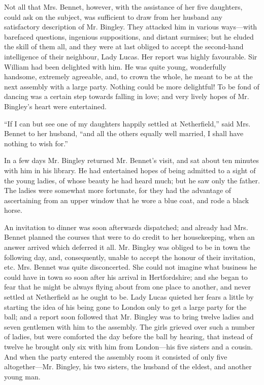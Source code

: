  Not all that Mrs. Bennet, however, with the assistance of her
      five daughters, could ask on the subject, was sufficient to draw
      from her husband any satisfactory description of Mr. Bingley.
      They attacked him in various ways—with barefaced questions,
      ingenious suppositions, and distant surmises; but he eluded the
      skill of them all, and they were at last obliged to accept the
      second-hand intelligence of their neighbour, Lady Lucas. Her
      report was highly favourable. Sir William had been delighted with
      him. He was quite young, wonderfully handsome, extremely
      agreeable, and, to crown the whole, he meant to be at the next
      assembly with a large party. Nothing could be more delightful! To
      be fond of dancing was a certain step towards falling in love;
      and very lively hopes of Mr. Bingley’s heart were entertained.

      “If I can but see one of my daughters happily settled at
      Netherfield,” said Mrs. Bennet to her husband, “and all the
      others equally well married, I shall have nothing to wish for.”

      In a few days Mr. Bingley returned Mr. Bennet’s visit, and sat
      about ten minutes with him in his library. He had entertained
      hopes of being admitted to a sight of the young ladies, of whose
      beauty he had heard much; but he saw only the father. The ladies
      were somewhat more fortunate, for they had the advantage of
      ascertaining from an upper window that he wore a blue coat, and
      rode a black horse.

      An invitation to dinner was soon afterwards dispatched; and
      already had Mrs. Bennet planned the courses that were to do
      credit to her housekeeping, when an answer arrived which deferred
      it all. Mr. Bingley was obliged to be in town the following day,
      and, consequently, unable to accept the honour of their
      invitation, etc. Mrs. Bennet was quite disconcerted. She could
      not imagine what business he could have in town so soon after his
      arrival in Hertfordshire; and she began to fear that he might be
      always flying about from one place to another, and never settled
      at Netherfield as he ought to be. Lady Lucas quieted her fears a
      little by starting the idea of his being gone to London only to
      get a large party for the ball; and a report soon followed that
      Mr. Bingley was to bring twelve ladies and seven gentlemen with
      him to the assembly. The girls grieved over such a number of
      ladies, but were comforted the day before the ball by hearing,
      that instead of twelve he brought only six with him from
      London—his five sisters and a cousin. And when the party entered
      the assembly room it consisted of only five altogether—Mr.
      Bingley, his two sisters, the husband of the eldest, and another
      young man.


